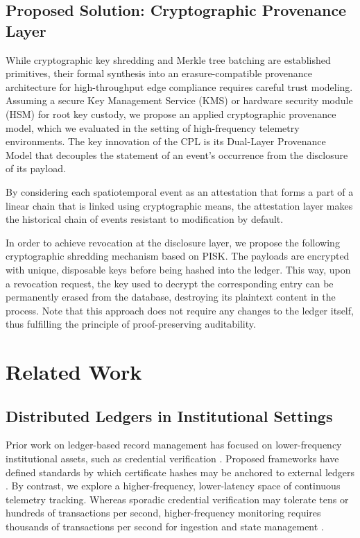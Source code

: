 \documentclass[conference]{IEEEtran}
\begin{document}
\subsection{Proposed Solution: Cryptographic Provenance Layer}

While cryptographic key shredding and Merkle tree batching are established primitives, their formal synthesis into an erasure-compatible provenance architecture for high-throughput edge compliance requires careful trust modeling. Assuming a secure Key Management Service (KMS) or hardware security module (HSM) for root key custody, we propose an applied cryptographic provenance model, which we evaluated in the setting of high-frequency telemetry environments. The key innovation of the CPL is its Dual-Layer Provenance Model that decouples the statement of an event's occurrence from the disclosure of its payload.

By considering each spatiotemporal event as an attestation that forms a part of a linear chain that is linked using cryptographic means, the attestation layer makes the historical chain of events resistant to modification by default.

In order to achieve revocation at the disclosure layer, we propose the following cryptographic shredding mechanism based on PISK. The payloads are encrypted with unique, disposable keys before being hashed into the ledger. This way, upon a revocation request, the key used to decrypt the corresponding entry can be permanently erased from the database, destroying its plaintext content in the process. Note that this approach does not require any changes to the ledger itself, thus fulfilling the principle of proof-preserving auditability.

\section{Related Work}

\subsection{Distributed Ledgers in Institutional Settings}
Prior work on ledger-based record management has focused on lower-frequency institutional assets, such as credential verification \cite{b1, b3}. Proposed frameworks have defined standards by which certificate hashes may be anchored to external ledgers \cite{b4}. By contrast, we explore a higher-frequency, lower-latency space of continuous telemetry tracking. Whereas sporadic credential verification may tolerate tens or hundreds of transactions per second, higher-frequency monitoring requires thousands of transactions per second for ingestion and state management \cite{b2, b11}.
\end{document}
